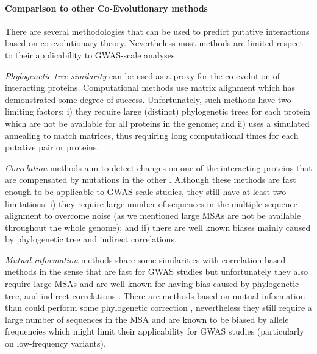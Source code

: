 \paragraph{Comparison to other Co-Evolutionary methods}
There are several methodologies that can be used to predict putative interactions based on co-evolutionary theory.
Nevertheless most methods are limited respect to their applicability to GWAS-scale analyses:

\textit{Phylogenetic tree similarity} can be used as a proxy for the co-evolution of interacting proteins. 
Computational methods use matrix alignment \cite{ramani2003exploiting} which has demonstrated some degree of success. 
Unfortunately, such methods have two limiting factors: 
i) they require large (distinct) phylogenetic trees for each protein which are not be available for all proteins in the genome; and 
ii) uses a simulated annealing to match matrices, thus requiring long computational times for each putative pair or proteins.

\textit{Correlation} methods aim to detect changes on one of the interacting proteins that are compensated by mutations in the other \cite{pazos1997correlated,gobel1994correlated}. 
Although these methods are fast enough to be applicable to GWAS scale studies, they still have at least two limitations: 
i) they require large number of sequences in the multiple sequence alignment to overcome noise (as we mentioned large MSAs are not be available throughout the whole genome); and 
ii) there are well known biases mainly caused by phylogenetic tree and indirect correlations. 
  
\textit{Mutual information} methods share some similarities with correlation-based methods in the sense that are fast for GWAS studies but unfortunately they also require large MSAs and are well known for having bias caused by phylogenetic tree, and indirect correlations \cite{fares2006novel}.
There are methods based on mutual information than could perform some phylogenetic correction \cite{de2013emerging}, nevertheless they still require a large number of sequences in the MSA and are known to be biased by allele frequencies \cite{dunn2008mutual} which might limit their applicability for GWAS studies (particularly on low-frequency variants).
    
